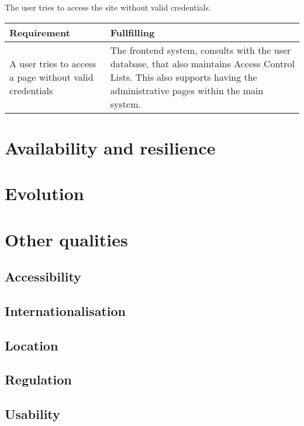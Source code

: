 The user tries to access the site without valid credentials.

\begin{table}
\centering
\begin{tabular}{p{5cm} | p{7cm}}
Requirement & Fullfilling \\ \hline
A user tries to access a page without valid credentials &
    The frontend system, consults with the user database, that also maintains
    Access Control Lists. This also supports having the administrative pages
    within the main system.\\
\end{tabular}
\end{table}

\section{Availability and resilience}
\label{sec:avail-resil}



\section{Evolution}
\label{sec:evolution}


\section{Other qualities}
\label{sec:other-qualities}

\subsection{Accessibility}
\label{sec:accessibility}


\subsection{Internationalisation}
\label{sec:internationalisation}


\subsection{Location}
\label{sec:location}


\subsection{Regulation}
\label{sec:regulation}


\subsection{Usability}
\label{sec:usability}


